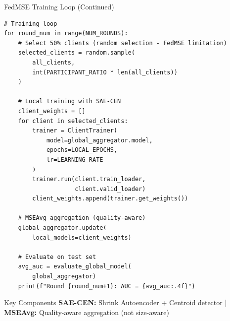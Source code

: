 \documentclass[10pt, aspectratio=169]{beamer}
\begin{document}
\begin{frame}[t]{FedMSE Training Loop (Continued)}
    \begin{lstlisting}[basicstyle=\ttfamily\scriptsize]
# Training loop
for round_num in range(NUM_ROUNDS):
    # Select 50% clients (random selection - FedMSE limitation)
    selected_clients = random.sample(
        all_clients, 
        int(PARTICIPANT_RATIO * len(all_clients))
    )
    
    # Local training with SAE-CEN
    client_weights = []
    for client in selected_clients:
        trainer = ClientTrainer(
            model=global_aggregator.model,
            epochs=LOCAL_EPOCHS,
            lr=LEARNING_RATE
        )
        trainer.run(client.train_loader, 
                    client.valid_loader)
        client_weights.append(trainer.get_weights())
    
    # MSEAvg aggregation (quality-aware)
    global_aggregator.update(
        local_models=client_weights)
    
    # Evaluate on test set
    avg_auc = evaluate_global_model(
        global_aggregator)
    print(f"Round {round_num+1}: AUC = {avg_auc:.4f}")
    \end{lstlisting}
    
    \vspace{0.3cm}
    \begin{alertblock}{Key Components}
        \textbf{SAE-CEN:} Shrink Autoencoder + Centroid detector | \textbf{MSEAvg:} Quality-aware aggregation (not size-aware)
    \end{alertblock}
\end{frame}
\end{document}
